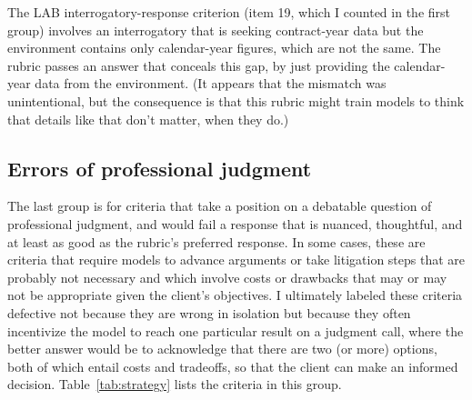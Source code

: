 \documentclass[11pt]{article}
\begin{document}
The LAB interrogatory-response criterion (item 19, which I counted in the first group) involves an interrogatory that is seeking contract-year data but the environment contains only calendar-year figures, which are not the same. The rubric passes an answer that conceals this gap, by just providing the calendar-year data from the environment. (It appears that the mismatch was unintentional, but the consequence is that this rubric might train models to think that details like that don't matter, when they do.)

\subsection{Errors of professional judgment}
\label{sec:strategy}

The last group is for criteria that take a position on a debatable question of professional judgment, and would fail a response that is nuanced, thoughtful, and at least as good as the rubric's preferred response. In some cases, these are criteria that require models to advance arguments or take litigation steps that are probably not necessary and which involve costs or drawbacks that may or may not be appropriate given the client's objectives. I ultimately labeled these criteria defective not because they are wrong in isolation but because they often incentivize the model to reach one particular result on a judgment call, where the better answer would be to acknowledge that there are two (or more) options, both of which entail costs and tradeoffs, so that the client can make an informed decision. Table~\ref{tab:strategy} lists the criteria in this group.
\end{document}

